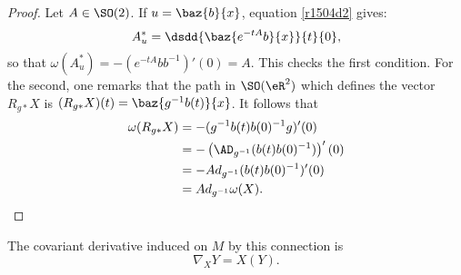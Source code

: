 \begin{proof}
	Let $A\in \SO(2)$. If $u=\baz{b}{x}$, equation \eqref{r1504d2} gives:
	\[
		A^*_u=\dsdd{\baz{e^{-tA}b}{x}}{t}{0},
	\]
	so that $\omega(A^*_u)=-(e^{-tA}bb^{-1})'(0)=A$. This checks the first condition. For the second, one remarks that the path in $\SO(\eR^2)$ which defines the vector $R_{g*}X$ is $(R_{g*}X)(t)=\baz{g^{-1} b(t)}{x}$. It follows that
	\begin{equation}
		\begin{split}
			\omega(R_{g*}X)&=-(g^{-1} b(t)b(0)^{-1} g)'(0)\\
			&=-\left(\AD_{g^{-1}}(b(t)b(0)^{-1})\right)'(0)\\
			&=-Ad_{g^{-1}}(b(t)b(0)^{-1})'(0)\\
			&=Ad_{g^{-1}}\omega(X).
		\end{split}
	\end{equation}

\end{proof}

\begin{proposition}
	The covariant derivative induced on $M$ by this connection is
	\begin{equation}\label{derrcovexplicite}
		\nabla_XY=X(Y).
	\end{equation}
\end{proposition}

